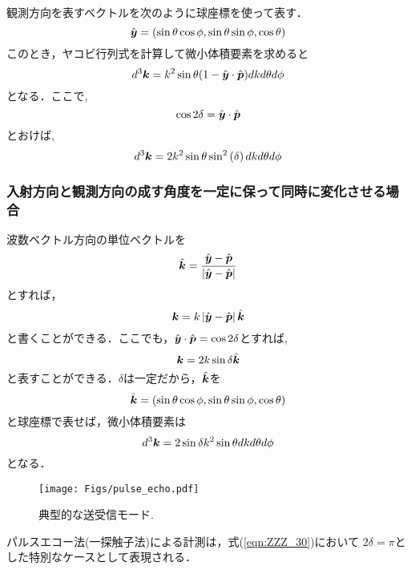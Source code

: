 	観測方向を表すベクトルを次のように球座標を使って表す．
	\begin{equation}
		\hat{\mbox{\boldmath $y$}}=(\sin\theta\cos\phi,\sin\theta\sin\phi, \cos\theta)
		\label{eqn:ZZZ_22}
	\end{equation}
	このとき，ヤコビ行列式を計算して微小体積要素を求めると
	\begin{equation}
		d^3\mbox{\boldmath $k$}=k^2\sin\theta (1-\hat{\mbox{\boldmath $y$}}\cdot\hat{\mbox{\boldmath $p$}})dkd\theta d\phi
		\label{eqn:ZZZ_23}
	\end{equation}
	となる．ここで,
	\begin{equation}
		\cos 2\delta=\hat{\mbox{\boldmath $y$}}\cdot\hat{\mbox{\boldmath $p$}}
		\label{eqn:ZZZ_24}
	\end{equation}
	とおけば,
	\begin{equation}
		d^3\mbox{\boldmath $k$}=2k^2\sin\theta \sin^2 \left(\delta\right) dkd\theta d\phi
		\label{eqn:ZZZ_25}
	\end{equation}
\subsubsection{
	入射方向と観測方向の成す角度を一定に保って同時に変化させる場合
}
	波数ベクトル方向の単位ベクトルを
	\begin{equation}
		\hat{\mbox{\boldmath $k$}}=\frac{\hat{\mbox{\boldmath $y$}}-\hat{\mbox{\boldmath $p$}}}
		{\left| \hat{\mbox{\boldmath $y$}}-\hat{\mbox{\boldmath $p$}} \right| }
		\label{eqn:ZZZ_26}
	\end{equation}
	とすれば，
	\begin{equation}
		\mbox{\boldmath $k$}= k\left| \hat{\mbox{\boldmath $y$}}-\hat{\mbox{\boldmath $p$}} \right| \hat{\mbox{\boldmath $k$}} 
		\label{eqn:ZZZ_27}
	\end{equation}
	と書くことができる．ここでも，$\hat{\mbox{\boldmath $y$}} \cdot \hat{\mbox{\boldmath $p$}}= \cos 2\delta$とすれば,	
	\begin{equation}
		\mbox{\boldmath $k$}= 2k \sin \delta\hat{\mbox{\boldmath $k$}} 
	\label{eqn:ZZZ_28}
	\end{equation}
	と表すことができる．$\delta$は一定だから，$\hat{\mbox{\boldmath $k$}}$を
	\begin{equation}
		\hat{\mbox{\boldmath $k$}}=(\sin\theta\cos\phi,\sin\theta\sin\phi, \cos\theta)
		\label{eqn:ZZZ_29}
	\end{equation}
	と球座標で表せば，微小体積要素は
	\begin{equation}
		d^3\mbox{\boldmath $k$}=2\sin \delta
		k^2 \sin\theta dkd\theta d\phi
		\label{eqn:ZZZ_30}
	\end{equation}
	となる．
\begin{figure}[h]
	\begin{center}
	\texttt{[image: Figs/pulse\_echo.pdf]} 
	\end{center}
	\caption{典型的な送受信モード.} 
	\label{fig:ZZZ_101}
\end{figure}
パルスエコー法(一探触子法)による計測は，式(\ref{eqn:ZZZ_30})において
$2\delta=\pi$とした特別なケースとして表現される．
